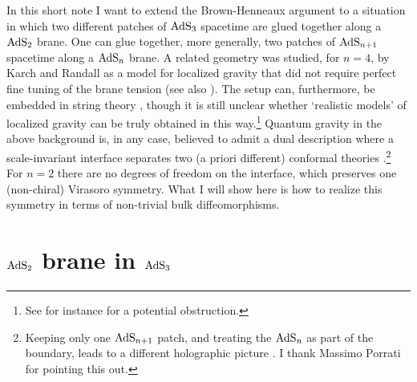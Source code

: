 \documentclass[a4paper,12pt,oneside]{article}
\begin{document}
  In this short note I want to  extend the Brown-Henneaux argument to
a situation in which  two different patches of ${\rm AdS}_3$
spacetime  are glued together along a ${\rm AdS}_2$  brane.
One can glue together, more generally, two patches of ${\rm AdS}_{n+1}$
spacetime  along a ${\rm AdS}_n$ brane. 
A related  geometry was studied, for $n=4$,  by
Karch and Randall \cite{KR1}  as a  model  for  localized gravity   
that did not require perfect fine tuning of the brane tension
(see also \cite{kalo,kim,also,Haw}). 
The setup can, furthermore,  be  embedded  in string theory \cite{BP,KR2},
though it is still  unclear whether `realistic models' of  
localized  gravity can be truly obtained in this way.\footnote{See
for instance \cite{B} for a potential obstruction.} 
Quantum gravity in the above background is, in any case,
 believed to admit  a
dual description where  a scale-invariant   interface separates two
(a priori different) conformal theories 
\cite{KR2,BDDO,DFO}.\footnote{Keeping only one ${\rm AdS}_{n+1}$ patch, and treating 
the ${\rm AdS}_n$ as part of the boundary, leads to a
different  holographic picture \cite{KR1,Por}.
I thank Massimo Porrati for pointing this out.}
 For $n=2$ there are no degrees of freedom
on the  interface, which  preserves one (non-chiral)
Virasoro symmetry. What  I will  show here is
how to realize this symmetry in terms 
of non-trivial bulk diffeomorphisms. 




\setcounter{equation}{0}
\section{${\rm AdS}_2$  brane in ${\rm AdS}_3$}
\end{document}
